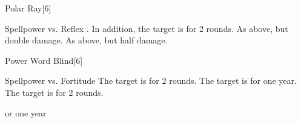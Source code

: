 \begin{spellsection}{Polar Ray}[6]
    \begin{spellheader}
    \end{spellheader}
    \begin{spellcontent}
        \begin{spelltargetinginfo}
        \end{spelltargetinginfo}
        \begin{spelleffects}
            \begin{spellattack}{Spellpower vs. Reflex}
                \spellsuccess {}. In addition, the target is \slowed for 2 rounds.
                \spellcritical As above, but double damage.
                \spellfailure As above, but half damage.
            \end{spellattack}
        \end{spelleffects}
    \end{spellcontent}
    \begin{spellfooter}
        \miscastrandom
    \end{spellfooter}
    \begin{spellaugments}
    \end{spellaugments}
\end{spellsection}

\begin{spellsection}{Power Word Blind}[6]
    \begin{spellheader}
    \end{spellheader}
    \begin{spellcontent}
        \begin{spelltargetinginfo}
        \end{spelltargetinginfo}
        \begin{spelleffects}
            \begin{spellattack}{Spellpower vs. Fortitude}
                \spellsuccess The target is \blinded for 2 rounds.
                \spellcritical The target is \blinded for one year.
                \spellfailure The target is \partiallyblinded for 2 rounds.
            \end{spellattack}
            \spelldur \durbrief or one year
        \end{spelleffects}
    \end{spellcontent}
    \begin{spellfooter}
        \miscastrandom
    \end{spellfooter}
\end{spellsection}

